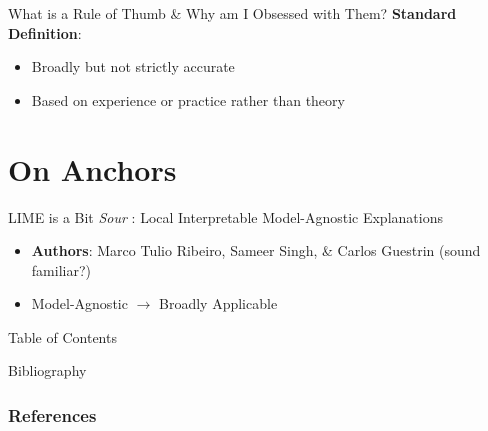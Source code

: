 \documentclass[11pt,dvipsnames,usenames,aspectratio=169]{beamer}  %
\begin{document}
\begin{frame}{What is a Rule of Thumb \& Why am I Obsessed with Them?}
  \textbf{Standard Definition}:
  \begin{itemize}
    \item Broadly but not strictly accurate
    \item Based on experience or practice rather than theory
  \end{itemize}

  \vspace{20pt}
\end{frame}

\section{On Anchors}

\begin{frame}{LIME is a Bit \textit{Sour}}
  : Local Interpretable Model-Agnostic Explanations~\citep{Ribeiro:2016}
  \begin{itemize}
    \item \textbf{Authors}: Marco Tulio Ribeiro, Sameer Singh, \& Carlos Guestrin (sound familiar?)
  \end{itemize}

  \vspace{20pt}
  \textbf{}
  \begin{itemize}
    \item Model-Agnostic $\rightarrow$ Broadly Applicable
  \end{itemize}
\end{frame}

\begin{frame}[noframenumbering]{Table of Contents}
  \tableofcontents
\end{frame}

\begin{frame}{Bibliography}{}
  {\tiny
    \frametitle{References}
    
    
  }
\end{frame}
\end{document}
